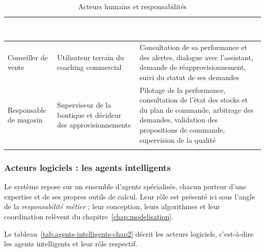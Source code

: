 \begin{longtable}{|P{3.0cm}|P{4.6cm}|P{6.4cm}|}
\hline
{}
\textcolor{white}{\textbf{Acteur}} &
\textcolor{white}{\textbf{Rôle}} &
\textcolor{white}{\textbf{Principales interactions attendues}} \\
\hline
\endhead
\hline
\endfoot
\hline
\endlastfoot
Conseiller de vente &
Utilisateur terrain du coaching commercial &
Consultation de sa performance et des alertes, dialogue avec l'assistant, demande de réapprovisionnement, suivi du statut de ses demandes \\
\hline
Responsable de magasin &
Superviseur de la boutique et décideur des approvisionnements &
Pilotage de la performance, consultation de l'état des stocks et du plan de commande, arbitrage des demandes, validation des propositions de commande, supervision de la qualité \\
\hline
\caption{Acteurs humains et responsabilités}
\label{tab:acteurs-humains-chap2}
\end{longtable}

\subsubsection{Acteurs logiciels : les agents intelligents}

Le système repose sur un ensemble d'agents spécialisés, chacun porteur d'une expertise et de ses propres outils de calcul. Leur rôle est présenté ici sous l'angle de la \textit{responsabilité métier} ; leur conception, leurs algorithmes et leur coordination relèvent du chapitre~\ref{chap:modelisation}.

Le tableau~\ref{tab:agents-intelligents-chap2} décrit les acteurs logiciels, c'est-à-dire les agents intelligents et leur rôle respectif.

